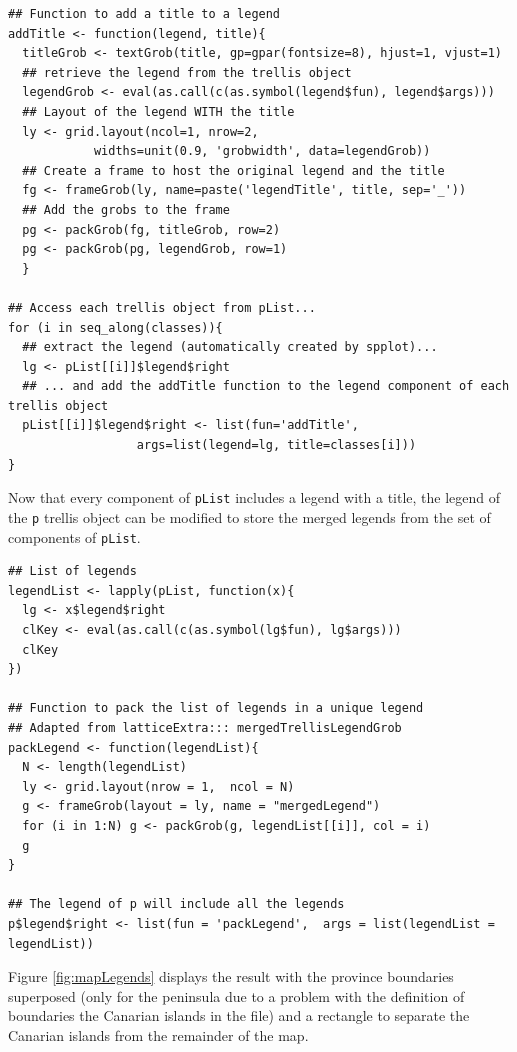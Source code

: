\documentclass[smallroyalvopaper]{memoir}
\begin{document}
\lstset{language=R,numbers=none}
\begin{lstlisting}
## Function to add a title to a legend
addTitle <- function(legend, title){
  titleGrob <- textGrob(title, gp=gpar(fontsize=8), hjust=1, vjust=1)
  ## retrieve the legend from the trellis object
  legendGrob <- eval(as.call(c(as.symbol(legend$fun), legend$args)))
  ## Layout of the legend WITH the title
  ly <- grid.layout(ncol=1, nrow=2,
		    widths=unit(0.9, 'grobwidth', data=legendGrob))
  ## Create a frame to host the original legend and the title
  fg <- frameGrob(ly, name=paste('legendTitle', title, sep='_'))
  ## Add the grobs to the frame
  pg <- packGrob(fg, titleGrob, row=2)
  pg <- packGrob(pg, legendGrob, row=1)
  }

## Access each trellis object from pList...
for (i in seq_along(classes)){
  ## extract the legend (automatically created by spplot)...
  lg <- pList[[i]]$legend$right
  ## ... and add the addTitle function to the legend component of each trellis object
  pList[[i]]$legend$right <- list(fun='addTitle',
				  args=list(legend=lg, title=classes[i]))
}
\end{lstlisting}

Now that every component of \texttt{pList} includes a legend with a title,
the legend of the \texttt{p} trellis object can be modified to store the
merged legends from the set of components of \texttt{pList}.

\lstset{language=R,numbers=none}
\begin{lstlisting}
## List of legends
legendList <- lapply(pList, function(x){
  lg <- x$legend$right
  clKey <- eval(as.call(c(as.symbol(lg$fun), lg$args)))
  clKey
})

## Function to pack the list of legends in a unique legend
## Adapted from latticeExtra::: mergedTrellisLegendGrob
packLegend <- function(legendList){
  N <- length(legendList)
  ly <- grid.layout(nrow = 1,  ncol = N)
  g <- frameGrob(layout = ly, name = "mergedLegend")
  for (i in 1:N) g <- packGrob(g, legendList[[i]], col = i)
  g
}

## The legend of p will include all the legends
p$legend$right <- list(fun = 'packLegend',  args = list(legendList = legendList))
\end{lstlisting}

Figure \ref{fig:mapLegends} displays the result with the province boundaries
superposed (only for the peninsula due to a problem with the
definition of boundaries the Canarian islands in the file) and a
rectangle to separate the Canarian islands from the remainder of the
map.
\end{document}
